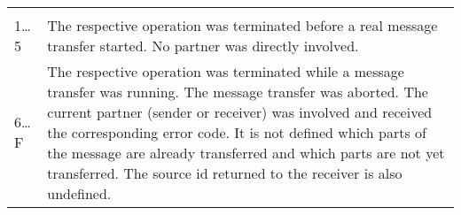 \documentclass[a4paper,11pt,twoside,dvips]{book}
\makeatletter
\newlength{\Up}\setlength{\Up}{-\baselineskip}
\newlength{\Params}
\newenvironment{param}[1] 
{%
\setlength{\Params}{\textwidth}\addtolength{\Params}{-140pt}%
\par\vspace{5pt}%
\noindent\begin{minipage}{\textwidth} 
\noindent {\em #1}\\[\Up]%
\noindent\begin{tabular}{@{\hspace*{75pt}}lp{\Params}}%
\hspace*{30pt}&\\[\Up]%
} 
{%
\end{tabular}\end{minipage}\par\vspace{5pt}%
}
\makeatother
\begin{document}
\begin{param}{ec}
\hspace*{\fill}1\dots 5~&The respective operation was
                         terminated before a 
                         real message transfer started. No
                         partner was directly involved.\\[5pt] 
\hspace*{\fill}6\dots F~&The respective operation was
                         terminated while a 
                         message transfer was running. The message
                         transfer was aborted. The current
                         partner (sender or receiver) was involved and
                         received 
                         the corresponding error code. It is not defined
                         which
                         parts of the message are already transferred and
                         which parts are not yet transferred. 
                         The source id returned to the receiver is also
                         undefined. \\
\end{param} 
 
 
 
\end{document}
